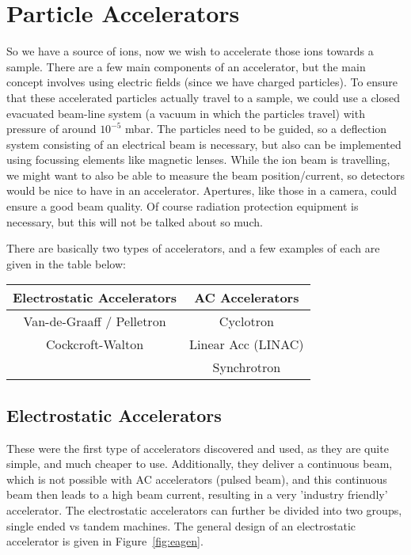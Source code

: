 

\chapter{Particle Accelerators}\label{ch:particle-accelerators}
So we have a source of ions, now we wish to accelerate those ions towards a sample.
There are a few main components of an accelerator, but the main concept involves using electric fields (since we have charged particles).
To ensure that these accelerated particles actually travel to a sample, we could use a closed evacuated beam-line system (a vacuum in which the particles travel) with pressure of around $10^{-5} $ mbar.
The particles need to be guided, so a deflection system consisting of an electrical beam is necessary, but also can be implemented using focussing elements like magnetic lenses.
While the ion beam is travelling, we might want to also be able to measure the beam position/current, so detectors would be nice to have in an accelerator.
Apertures, like those in a camera, could ensure a good beam quality.
Of course radiation protection equipment is necessary, but this will not be talked about so much.

There are basically two types of accelerators, and a few examples of each are given in the table below:
\begin{center}
\begin{tabular}{ c | c }
	\hline
	Electrostatic Accelerators & AC Accelerators \\
	\hline
	Van-de-Graaff / Pelletron & Cyclotron \\
	Cockcroft-Walton & Linear Acc (LINAC) \\
	& Synchrotron
\end{tabular}
\end{center}

\section{Electrostatic Accelerators}\label{sec:electrostatic-accelerators}
These were the first type of accelerators discovered and used, as they are quite simple, and much cheaper to use.
Additionally, they deliver a continuous beam, which is not possible with AC accelerators (pulsed beam), and this continuous beam then leads to a high beam current, resulting in a very 'industry friendly' accelerator.
The electrostatic accelerators can further be divided into two groups, single ended vs tandem machines.
The general design of an electrostatic accelerator is given in Figure~\ref{fig:eagen}.

